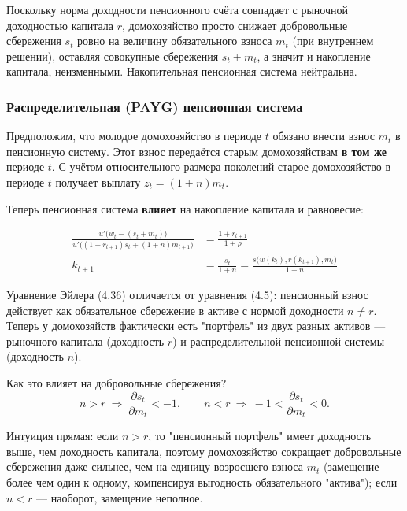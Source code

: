 \documentclass[10pt,a4paper]{article}
\begin{document}
\begin{intuition}
Поскольку норма доходности пенсионного счёта совпадает с рыночной доходностью капитала $r$, домохозяйство просто снижает добровольные сбережения $s_t$ ровно на величину обязательного взноса $m_t$ (при внутреннем решении), оставляя совокупные сбережения $s_t+m_t$, а значит и накопление капитала, неизменными. Накопительная пенсионная система нейтральна.
\end{intuition}

\subsubsection{Распределительная (PAYG) пенсионная система}

Предположим, что молодое домохозяйство в периоде $t$ обязано внести взнос $m_t$ в пенсионную систему. Этот взнос передаётся старым домохозяйствам \textbf{в том же} периоде $t$. С учётом относительного размера поколений старое домохозяйство в периоде $t$ получает выплату $z_t = (1+n)m_t$.

Теперь пенсионная система \textbf{влияет} на накопление капитала и равновесие:
\begin{formulabox}
\begin{align}
\frac{u'\big(w_t - (s_t+m_t)\big)}{u'\big((1+r_{t+1})s_t + (1+n)m_{t+1}\big)} &= \frac{1+r_{t+1}}{1+\rho} \tag{4.36}\\
k_{t+1} &= \frac{s_t}{1+n} = \frac{s\big(w(k_t), r(k_{t+1}), m_t\big)}{1+n} \tag{4.37}
\end{align}
\end{formulabox}

\begin{intuition}
Уравнение Эйлера (4.36) отличается от уравнения (4.5): пенсионный взнос действует как обязательное сбережение в активе с нормой доходности $n \ne r$. Теперь у домохозяйств фактически есть "портфель" из двух разных активов — рыночного капитала (доходность $r$) и распределительной пенсионной системы (доходность $n$).
\end{intuition}

Как это влияет на добровольные сбережения?
$$n > r \ \Rightarrow\ \frac{\partial s_t}{\partial m_t} < -1, \qquad n < r \ \Rightarrow\ -1 < \frac{\partial s_t}{\partial m_t} < 0.$$

\begin{intuition}
Интуиция прямая: если $n>r$, то "пенсионный портфель" имеет доходность выше, чем доходность капитала, поэтому домохозяйство сокращает добровольные сбережения даже сильнее, чем на единицу возросшего взноса $m_t$ (замещение более чем один к одному, компенсируя выгодность обязательного "актива"); если $n<r$ — наоборот, замещение неполное.
\end{intuition}
\end{document}
